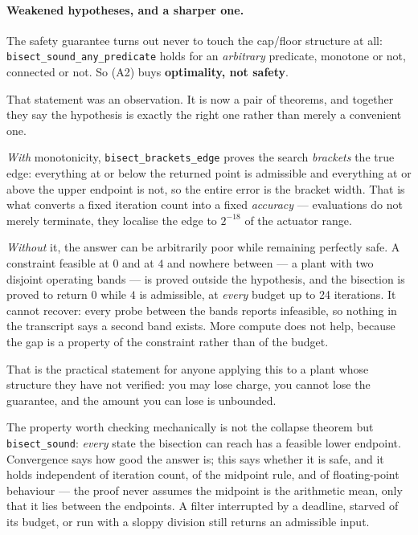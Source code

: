 \documentclass[11pt,letterpaper]{article}
\theoremstyle{definition}
\theoremstyle{remark}
\begin{document}
\paragraph{Weakened hypotheses, and a sharper one.} The safety guarantee
turns out never to touch the cap/floor structure at all: \texttt{bisect\_sound\_any\_predicate}
holds for an \emph{arbitrary} predicate, monotone or not, connected or not. So (A2) buys
\textbf{optimality, not safety}.

That statement was an observation. It is now a pair of theorems, and together they say the
hypothesis is exactly the right one rather than merely a convenient one.

\emph{With} monotonicity, \texttt{bisect\_brackets\_edge} proves the search \emph{brackets} the
true edge: everything at or below the returned point is admissible and everything at or above
the upper endpoint is not, so the entire error is the bracket width. That is what converts a
fixed iteration count into a fixed \emph{accuracy} --- \evalCharge{} evaluations do not merely
terminate, they localise the edge to $2^{-18}$ of the actuator range.

\emph{Without} it, the answer can be arbitrarily poor while remaining perfectly safe. A
constraint feasible at $0$ and at $4$ and nowhere between --- a plant with two disjoint
operating bands --- is proved outside the hypothesis, and the bisection is proved to return $0$
while $4$ is admissible, at \emph{every} budget up to 24 iterations. It cannot recover: every
probe between the bands reports infeasible, so nothing in the transcript says a second band
exists. More compute does not help, because the gap is a property of the constraint rather than
of the budget.

That is the practical statement for anyone applying this to a plant whose structure they have
not verified: you may lose charge, you cannot lose the guarantee, and the amount you can lose is
unbounded.

The property worth checking mechanically is not the collapse theorem but
\texttt{bisect\_sound}: \emph{every} state the bisection can reach has a feasible lower
endpoint. Convergence says how good the answer is; this says whether it is safe, and it holds
independent of iteration count, of the midpoint rule, and of floating-point behaviour --- the
proof never assumes the midpoint is the arithmetic mean, only that it lies between the
endpoints. A filter interrupted by a deadline, starved of its budget, or run with a sloppy
division still returns an admissible input.
\end{document}
